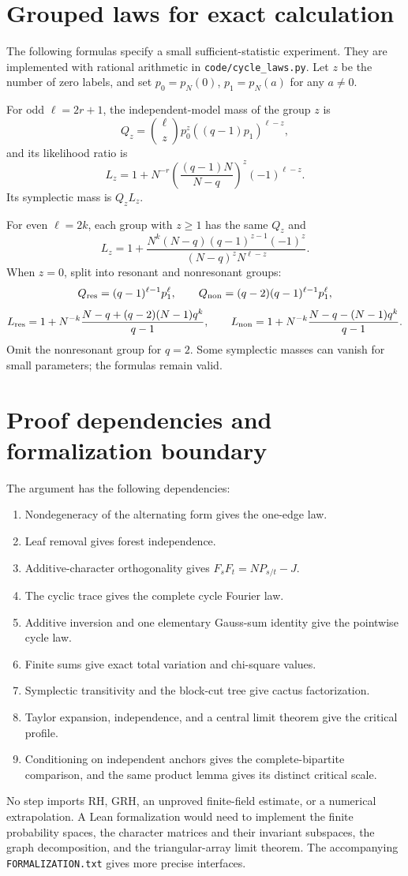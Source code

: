 \section{Grouped laws for exact calculation}\label{app:groups}
The following formulas specify a small sufficient-statistic experiment.
They are implemented with rational arithmetic in \texttt{code/cycle\_laws.py}.
Let $z$ be the number of zero labels, and set $p_0=p_N(0)$,
$p_1=p_N(a)$ for any $a\ne0$.

For odd $\ell=2r+1$, the independent-model mass of the group $z$ is
\[
Q_z=\binom{\ell}{z}p_0^z((q-1)p_1)^{\ell-z},
\]
and its likelihood ratio is
\[
L_z=1+N^{-r}
\left(\frac{(q-1)N}{N-q}\right)^z(-1)^{\ell-z}.
\]
Its symplectic mass is $Q_zL_z$.

For even $\ell=2k$, each group with $z\ge1$ has the same $Q_z$ and
\[
L_z
=1+\frac{N^k(N-q)(q-1)^{z-1}(-1)^z}
{(N-q)^z N^{\ell-z}}.
\]
When $z=0$, split into resonant and nonresonant groups:
\[
Q_{\rm res}=(q-1)^{\ell-1}p_1^\ell,\qquad
Q_{\rm non}=(q-2)(q-1)^{\ell-1}p_1^\ell,
\]
\[
L_{\rm res}
=1+N^{-k}\frac{N-q+(q-2)(N-1)q^k}{q-1},\qquad
L_{\rm non}
=1+N^{-k}\frac{N-q-(N-1)q^k}{q-1}.
\]
Omit the nonresonant group for $q=2$. Some symplectic masses can vanish for
small parameters; the formulas remain valid.

\section{Proof dependencies and formalization boundary}
The argument has the following dependencies:
\begin{enumerate}
\item Nondegeneracy of the alternating form gives the one-edge law.
\item Leaf removal gives forest independence.
\item Additive-character orthogonality gives $F_sF_t=NP_{s/t}-J$.
\item The cyclic trace gives the complete cycle Fourier law.
\item Additive inversion and one elementary Gauss-sum identity give the
pointwise cycle law.
\item Finite sums give exact total variation and chi-square values.
\item Symplectic transitivity and the block-cut tree give cactus factorization.
\item Taylor expansion, independence, and a central limit theorem give the
critical profile.
\item Conditioning on independent anchors gives the complete-bipartite
comparison, and the same product lemma gives its distinct critical scale.
\end{enumerate}
No step imports RH, GRH, an unproved finite-field estimate, or a numerical
extrapolation. A Lean formalization would need to implement the finite
probability spaces, the character matrices and their invariant subspaces,
the graph decomposition, and the triangular-array limit theorem.
The accompanying \texttt{FORMALIZATION.txt} gives more precise interfaces.

